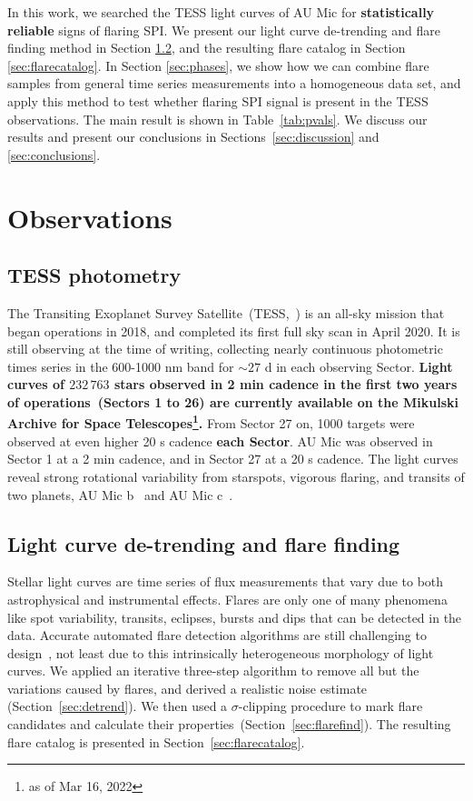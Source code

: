 \documentclass[fleqn,usenatbib]{mnras}%
\begin{document}
In this work, we searched the TESS light curves of AU Mic for \textbf{statistically reliable} signs of flaring SPI. We present our light curve de-trending and flare finding method in Section \ref{sec:detrendfind}, and the resulting flare catalog in Section \ref{sec:flarecatalog}. In Section \ref{sec:phases}, we show how we can combine flare samples from general time series measurements into a homogeneous data set, and apply this method to test whether flaring SPI signal is present in the TESS observations. The main result is shown in Table~\ref{tab:pvals}. We discuss our results and present our conclusions in Sections~\ref{sec:discussion} and \ref{sec:conclusions}.
\section{Observations}
\subsection{TESS photometry}
The Transiting Exoplanet Survey Satellite~(TESS,~\citealt{ricker2014}) is an all-sky mission that began operations in 2018, and completed its first full sky scan in April 2020. It is still observing at the time of writing, collecting nearly continuous photometric times series in the 600-1000 nm band for $\sim 27$ d in each observing Sector. \textbf{Light curves of $232\,763$ stars observed in 2 min cadence in the first two years of operations~(Sectors 1 to 26) are currently available on the Mikulski Archive for Space Telescopes\footnote{as of Mar 16, 2022}.} From Sector 27 on, 1000 targets were observed at even higher 20 s cadence \textbf{each Sector}. AU Mic was observed in Sector 1 at a 2 min cadence, and in Sector 27 at a 20 s cadence. The light curves reveal strong rotational variability from starspots, vigorous flaring, and transits of two planets, AU Mic b~\citep{plavchan2020,martioli2021new} and AU Mic c~\citep{plavchan2020,martioli2021new}.

\subsection{Light curve de-trending and flare finding}
\label{sec:detrendfind}
Stellar light curves are time series of flux measurements that vary due to both astrophysical and instrumental effects. Flares are only one of many phenomena like spot variability, transits, eclipses, bursts and dips that can be detected in the data. Accurate automated flare detection algorithms are still challenging to design~\citep{vida2021}, not least due to this intrinsically heterogeneous morphology of light curves. We applied an iterative three-step algorithm to remove all but the variations caused by flares, and derived a realistic noise estimate (Section~\ref{sec:detrend}). We then used a $\sigma$-clipping procedure to mark flare candidates and calculate their properties~(Section~\ref{sec:flarefind}). The resulting flare catalog is presented in Section~\ref{sec:flarecatalog}.
\end{document}

